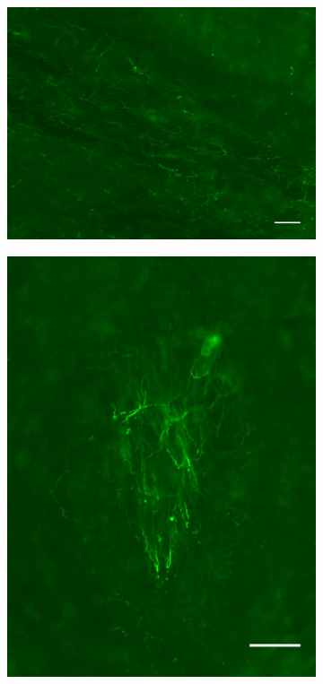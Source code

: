 \begin{figure}[h]
\begin{center}
\begin{subfigure}[h]{0.329\textwidth}
			\end{subfigure}
			\begin{subfigure}[h]{0.329\textwidth}
				\caption{}
				\label{fig:locaMuSKcc}
				\includegraphics[width=\textwidth]{./Images/Immuno/Musk/MuSK_cc_50um.jpg}
			\end{subfigure}
			\begin{subfigure}[h]{0.329\textwidth}
				\caption{}
				\label{fig:locaMuSKfr}
				\includegraphics[width=\textwidth]{./Images/Immuno/Musk/MuSK_fr_50um.jpg}

\end{subfigure}
\end{center}
\end{figure}
